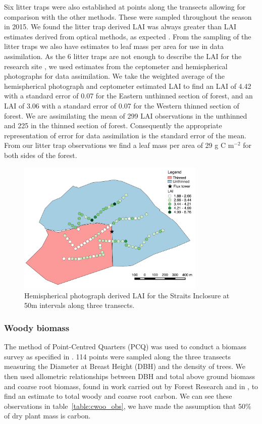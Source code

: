 \documentclass[12pt]{article}
\begin{document}
Six litter traps were also established at points along the transects allowing for comparison with the other methods. These were sampled throughout the season in 2015. We found the litter trap derived LAI was always greater than LAI estimates derived from optical methods, as expected \citep{breda2003ground}. From the sampling of the litter traps we also have estimates to leaf mass per area for use in data assimilation. As the 6 litter traps are not enough to describe the LAI for the research site \citep{kimmins1973some}, we used estimates from the ceptometer and hemispherical photographs for data assimilation. We take the weighted average of the hemispherical photograph and ceptometer estimated LAI to find an LAI of 4.42 with a standard error of 0.07 for the Eastern unthinned section of forest, and an LAI of 3.06 with a standard error of 0.07 for the Western thinned section of forest. We are assimilating the mean of 299 LAI observations in the unthinned and 225 in the thinned section of forest. Consequently the appropriate representation of error for data assimilation is the standard error of the mean. From our litter trap observations we find a leaf mass per area of 29 g C m\(^{-2}\) for both sides of the forest.


\begin{figure}[ht]
    \centering
    \includegraphics[width=0.8\textwidth]{thinned.pdf}
    \caption{Hemispherical photograph derived LAI for the Straits Inclosure at 50m intervals along three transects.} \label{fig:hemi_lai}
\end{figure}

\subsubsection{Woody biomass}  
The method of Point-Centred Quarters (PCQ) was used to conduct a biomass survey as specified in \citet{dahdouh2006empirical}. 114 points were sampled along the three transects measuring the Diameter at Breast Height (DBH) and the density of trees. We then used allometric relationships between DBH and total above ground biomass and coarse root biomass, found in work carried out by Forest Research and in \citet{mckay2003woodfuel}, to find an estimate to total woody and coarse root carbon. We can see these observations in table~\ref{table:cwoo_obs}, we have made the assumption that 50\% of dry plant mass is carbon.
\end{document}
